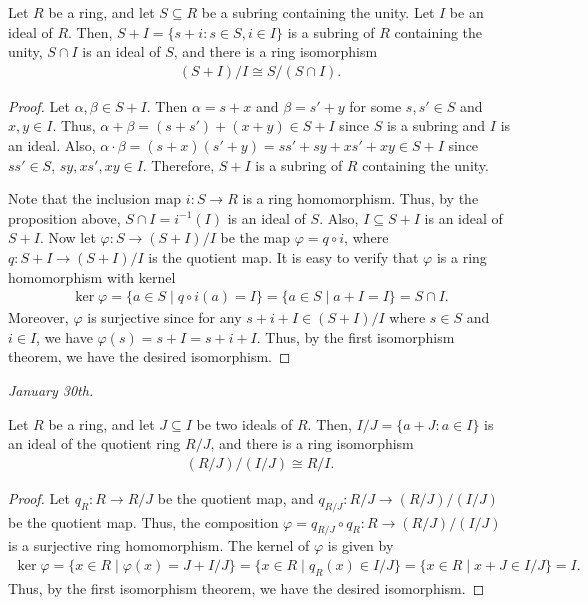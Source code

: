 \begin{theorem}
    Let $R$ be a ring, and let $S \subseteq R$ be a subring containing the unity. Let $I$ be an ideal of $R$. Then, $S + I = \{s + i : s \in S, i \in I\}$ is a subring of $R$ containing the unity, $S \cap I$ is an ideal of $S$, and there is a ring isomorphism
    \begin{align}
        (S + I)/I \cong S/(S \cap I).
    \end{align}
\end{theorem}
\begin{proof}
    Let $\alpha,\beta \in S+I$. Then $\alpha = s+x$ and $\beta = s'+y$ for some $s,s' \in S$ and $x,y \in I$. Thus, $\alpha + \beta = (s + s') + (x + y) \in S + I$ since $S$ is a subring and $I$ is an ideal. Also, $\alpha \cdot \beta = (s + x)(s' + y) = ss' + sy + xs' + xy \in S + I$ since $ss' \in S$, $sy, xs', xy \in I$. Therefore, $S + I$ is a subring of $R$ containing the unity.

    Note that the inclusion map $i:S \to R$ is a ring homomorphism. Thus, by the proposition above, $S \cap I = i^{-1}(I)$ is an ideal of $S$. Also, $I \subseteq S+I$ is an ideal of $S+I$. Now let $\varphi : S \to (S+I)/I$ be the map $\varphi = q \circ i$, where $q : S + I \to (S + I)/I$ is the quotient map. It is easy to verify that $\varphi$ is a ring homomorphism with kernel
    \begin{align}
        \ker \varphi = \{a \in S \mid q \circ i(a) = I\} = \{a \in S \mid a + I = I\} = S \cap I.
    \end{align}
    Moreover, $\varphi$ is surjective since for any $s + i + I \in (S + I)/I$ where $s \in S$ and $i \in I$, we have $\varphi(s) = s + I = s + i + I$. Thus, by the first isomorphism theorem, we have the desired isomorphism.
\end{proof}

\textit{January 30th.}

\begin{theorem}
    Let $R$ be a ring, and let $J \subseteq I$ be two ideals of $R$. Then, $I/J = \{a + J : a \in I\}$ is an ideal of the quotient ring $R/J$, and there is a ring isomorphism
    \begin{align}
        (R/J)/(I/J) \cong R/I.
    \end{align}
\end{theorem}
\begin{proof}
    Let $q_{R} : R \to R/J$ be the quotient map, and $q_{R/J} : R/J \to (R/J)/(I/J)$ be the quotient map. Thus, the composition $\varphi = q_{R/J} \circ q_{R} : R \to (R/J)/(I/J)$ is a surjective ring homomorphism. The kernel of $\varphi$ is given by
    \begin{align}
        \ker \varphi = \{x \in R \mid \varphi(x) = J + I/J\} = \{x \in R \mid q_{R}(x) \in I/J\} = \{x \in R \mid x + J \in I/J\} = I.
    \end{align}
    Thus, by the first isomorphism theorem, we have the desired isomorphism.
\end{proof}


